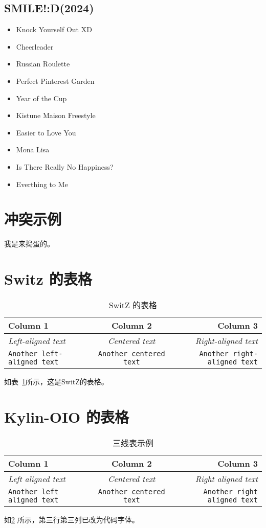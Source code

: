 \documentclass{article}
\begin{document}
\subsection{SMILE!:D(2024)}
\begin{itemize}
    \item Knock Yourself Out XD
    \item Cheerleader
    \item Russian Roulette
    \item Perfect Pinterest Garden
    \item Year of the Cup
    \item Kistune Maison Freestyle
    \item Easier to Love You
    \item Mona Lisa
    \item Is There Really No Happiness?
    \item Everthing to Me
\end{itemize}

    \section{冲突示例}

    我是来捣蛋的。

    \section{ Switz 的表格}
    \begin{table}[h]
        \centering
        \begin{tabular}{lcr}
            \toprule
            \textbf{Column 1} & \textbf{Column 2} & \textbf{Column 3} \\
            \midrule
            \textit{Left-aligned text} & \textit{Centered text} & \textit{Right-aligned text} \\
            \texttt{Another left-aligned text} & \texttt{Another centered text} & \texttt{Another right-aligned text} \\
            \bottomrule
        \end{tabular}
        \caption{SwitZ 的表格}
        \label{tab:switz}
    \end{table}
    如表~\ref{tab:switz}所示，这是SwitZ的表格。
    \section{ Kylin-OIO 的表格}
    \begin{table}[h]
        \centering
        \begin{tabular}{l c r} 
            \toprule
          \textbf{Column 1} & \textbf{Column 2} & \textbf{Column 3} \\
          \midrule
           \textit{Left aligned text}  & \textit{Centered text} & \textit{Right aligned text} \\
           \texttt{Another left aligned text} & \texttt{Another centered text} & \texttt{Another right aligned text}\\
           \bottomrule
        \end{tabular}
        \caption{三线表示例}
        \label{tab:my_table}
    \end{table}
    
    如\ref{tab:my_table} 所示，第三行第三列已改为代码字体。
\end{document}
